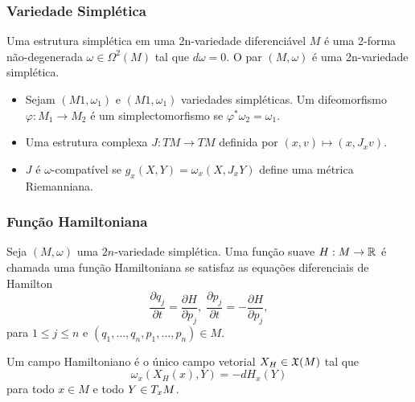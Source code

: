 \documentclass{beamer}
\begin{document}
\begin{footnotesize}
\begin{frame}
\begin{prova}
		\end{prova}
	\end{frame}
	

	\begin{frame}
		\frametitle{Variedade Simplética}
		\begin{definicao}
			
			Uma estrutura simplética em uma 2n-variedade diferenciável $M$ é uma 2-forma não-degenerada $\omega\in \Omega^{2}(M)$ tal que $d\omega=0$. O par $(M, \omega)$ é uma 2n-variedade simplética.
		\end{definicao}
		
		\begin{itemize}
			\item Sejam $(M1, \omega_{1})$ e $(M1, \omega_{1})$ variedades simpléticas. Um difeomorfismo $\varphi: M_1\to M_2$ é um simplectomorfismo se $\varphi^{*}\omega_{2}=\omega_{1}$.
			
			\item Uma estrutura complexa $J:TM\to TM$ definida por $(x, v)\mapsto (x, J_{x}v)$.
			
			\item $J$ é $\omega$-compatível se $g_{x}(X,Y) = \omega_{x}(X, J_{x}Y)$ define uma métrica Riemanniana.
		\end{itemize}
		
	\end{frame}
	
	\begin{frame}
		\frametitle{Função Hamiltoniana}
		\begin{definicao}
			Seja $(M, \omega)$ uma $2n$-variedade simplética. Uma função suave $H : M \to \mathbb{R}^{}$ é chamada uma função Hamiltoniana se satisfaz as equações diferenciais de Hamilton
			$$
			\frac{\partial q_{j}}{\partial t} = \frac{\partial H}{\partial p_{j}}, \; \frac{\partial p_{j}}{\partial t} = -\frac{\partial H}{\partial p_{j}},
			$$
			para $1\leq j \leq n$ e $(q_{1}, \dots, q_{n}, p_{1}, \dots, p_{n}) \in M$.
		\end{definicao}
		
		\begin{definicao}
			Um campo Hamiltoniano é o único campo vetorial $X_{H}\in \mathfrak{X}(M)$ tal que
			$$
			\omega_{x}(X_{H}(x), Y) = -dH_{x}(Y)
			$$
			para todo $x\in M$ e todo $Y \in T_{x}M$.
		\end{definicao}
		
		
	\end{frame}


\end{footnotesize}
\end{document}
